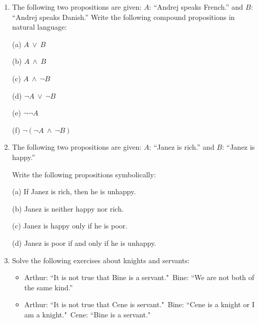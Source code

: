 \documentclass[11pt,paper=b5,footinclude,headinclude]{scrbook} %
\def\ali {{~\vee~}}
\def\inn {{~\wedge~}}
\begin{document}
\begin{enumerate}
\item
The following two propositions are given:
$A$: ``Andrej speaks French.'' and $B$: ``Andrej speaks Danish.''
Write the following compound propositions in natural language:

(a) $A\ali B$

(b) $A\inn B$

(c) $A\inn \neg B$

(d) $\neg A\ali \neg B$

(e) $\neg \neg A$

(f) $\neg (\neg A\inn \neg B)$

\medskip
\item
The following two propositions are given:
$A$: ``Janez is rich.'' and $B$: ``Janez is happy.''

Write the following propositions symbolically:

(a) If Janez is rich, then he is unhappy.

(b) Janez is neither happy nor rich.

(c) Janez is happy only if he is poor.

(d) Janez is poor if and only if he is unhappy.

\item Solve the following exercises about knights and servants:
\begin{itemize}
  \item Arthur: ``It is not true that Bine is a servant."~Bine: ``We are not both of the same kind.''
  \item Arthur: ``It is not true that Cene is servant."~Bine: ``Cene is a knight or I am a knight."~Cene: ``Bine is a servant."
\end{itemize}


\end{enumerate}
\end{document}
